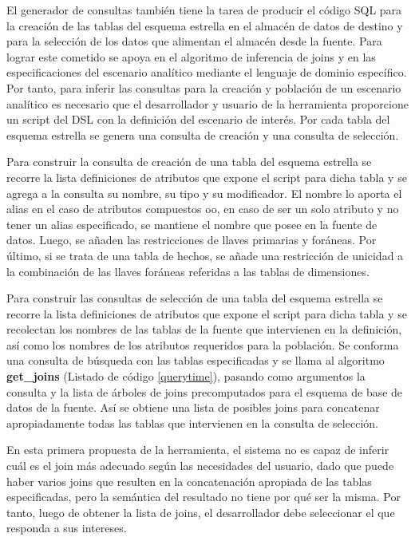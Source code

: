 El generador de consultas también tiene la tarea de producir el código SQL para la creación de las 
tablas del esquema estrella en el almacén de datos de destino y para la selección de 
los datos que alimentan el almacén desde la fuente. Para lograr este cometido se apoya 
en el algoritmo de inferencia de joins y en las especificaciones del escenario analítico 
mediante el lenguaje de dominio específico. Por tanto, para inferir las consultas para 
la creación y población de un escenario analítico es necesario que el desarrollador y 
usuario de la herramienta proporcione un script del DSL con la definición del escenario 
de inter\'es. Por cada tabla del esquema estrella se genera una consulta de creación y una 
consulta de selección.

Para construir la consulta de creación de una tabla del esquema estrella se recorre 
la lista definiciones de atributos que expone el script para dicha tabla y se agrega a la consulta 
su nombre, su tipo y su modificador. 
El nombre lo aporta el alias en el caso de atributos compuestos oo, en caso de ser un solo atributo y no tener un alias especificado, 
se mantiene el nombre que posee en la fuente de datos. Luego, se 
añaden las restricciones de llaves primarias y for\'aneas. Por \'ultimo, si se trata de una tabla 
de hechos, se añade una restricción de unicidad a la combinación de las llaves foráneas referidas a las 
tablas de dimensiones.

Para construir las consultas de selección de una tabla del esquema estrella se recorre la 
lista definiciones de atributos que expone el script para dicha tabla y se recolectan los 
nombres de las tablas de la fuente que intervienen en la definición, así como los 
nombres de los atributos requeridos para la población.
Se conforma una consulta de b\'usqueda con las tablas especificadas y se llama al algoritmo \textbf{get\_joins} (Listado de c\'odigo \ref{querytime}),
pasando como argumentos la consulta y la lista de \'arboles de joins precomputados para el esquema 
de base de datos de la fuente. As\'i se obtiene una lista de posibles joins para concatenar apropiadamente todas las 
tablas que intervienen en la consulta de selección.

En esta primera propuesta de la herramienta, el sistema no es capaz de inferir cu\'al es el join 
m\'as adecuado según las necesidades del usuario, dado que puede haber varios joins que resulten 
en la concatenación apropiada de las tablas especificadas, pero la semántica del resultado no tiene por qu\'e ser 
la misma. Por tanto, luego de obtener la lista de joins, el desarrollador debe seleccionar el que responda 
a sus intereses.

